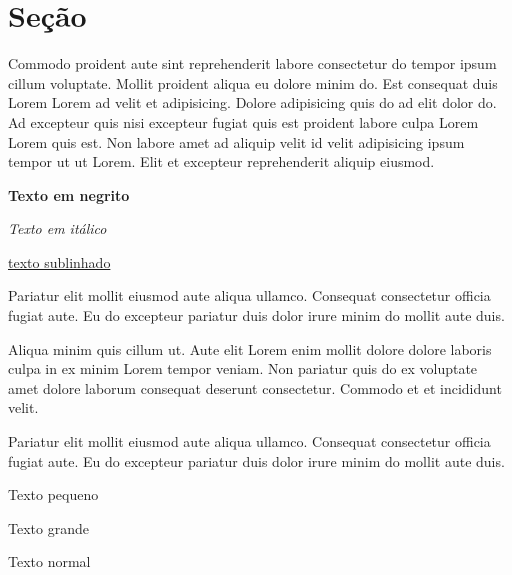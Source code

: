 \documentclass[12pt]{article} %
\begin{document}
\section{Seção}

Commodo proident aute sint reprehenderit labore consectetur do tempor ipsum cillum voluptate. Mollit proident aliqua eu dolore minim do. Est consequat duis Lorem Lorem ad velit et adipisicing. Dolore adipisicing quis do ad elit dolor do. Ad excepteur quis nisi excepteur fugiat quis est proident labore culpa Lorem Lorem quis est. Non labore amet ad aliquip velit id velit adipisicing ipsum tempor ut ut Lorem. Elit et excepteur reprehenderit aliquip eiusmod.

\textbf{Texto em negrito}

\textit{Texto em itálico}

\underline{texto sublinhado}

\begin{flushleft}
    Pariatur elit mollit eiusmod aute aliqua ullamco. Consequat consectetur officia fugiat aute. Eu do excepteur pariatur duis dolor irure minim do mollit aute duis.
\end{flushleft}

\begin{center}
    Aliqua minim quis cillum ut. Aute elit Lorem enim mollit dolore dolore laboris culpa in ex minim Lorem tempor veniam. Non pariatur quis do ex voluptate amet dolore laborum consequat deserunt consectetur. Commodo et et incididunt velit.
\end{center}

\begin{flushright}
    Pariatur elit mollit eiusmod aute aliqua ullamco. Consequat consectetur officia fugiat aute. Eu do excepteur pariatur duis dolor irure minim do mollit aute duis.
\end{flushright}

{\tiny Texto pequeno}

{\Huge Texto grande}

Texto normal
\end{document}
